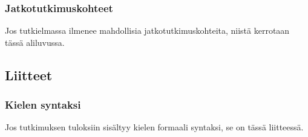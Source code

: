 \subsubsection{Jatkotutkimuskohteet}

Jos tutkielmassa ilmenee mahdollisia jatkotutkimuskohteita, niistä kerrotaan
tässä aliluvussa.

\renewcommand{\thesubsubsection}{Liite \arabic{subsubsection}. }

\subsection{Liitteet}

\subsubsection{Kielen syntaksi}

Jos tutkimuksen tuloksiin sisältyy kielen formaali syntaksi, se on tässä
liitteessä.
